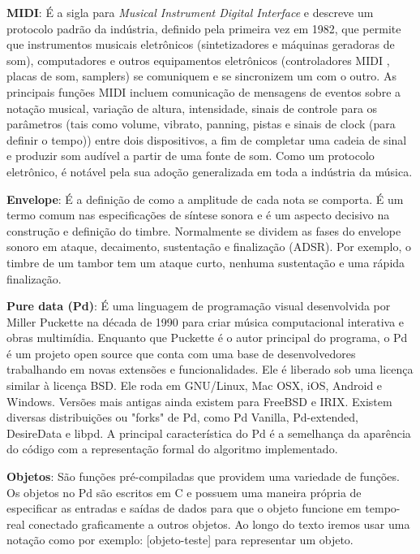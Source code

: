 \documentclass[draft]{ppgmus}
\begin{document}

\textbf{MIDI}: É a sigla para \textit{Musical Instrument Digital Interface} e descreve um protocolo padrão da indústria, 
definido pela primeira vez em 1982, que permite que instrumentos musicais eletrônicos 
(sintetizadores e máquinas geradoras de som), computadores e outros equipamentos eletrônicos (controladores MIDI , 
placas de som, samplers) se comuniquem e se sincronizem um com o outro. 
As principais funções MIDI incluem comunicação de mensagens de eventos sobre a notação musical,  variação de altura, 
intensidade, sinais de controle para os parâmetros (tais como volume, vibrato, panning, pistas e sinais de 
clock (para definir o tempo)) entre dois dispositivos, a fim de completar uma cadeia de sinal e produzir som 
audível a partir de uma fonte de som. Como um protocolo eletrônico, é notável pela sua adoção generalizada em 
toda a indústria da música.


\textbf{Envelope}: É a definição de como a amplitude de cada nota se comporta.
É um termo comum nas especificações de síntese sonora e é um aspecto decisivo na construção e 
definição do timbre. Normalmente se dividem as fases do
envelope sonoro em ataque, decaimento, sustentação e finalização (ADSR). Por
exemplo, o timbre de um tambor tem um ataque curto, nenhuma sustentação
e uma rápida finalização.

\textbf{Pure data (Pd)}: É uma linguagem de programação visual desenvolvida por Miller Puckette na década de 1990 
para criar música computacional interativa e obras multimídia. Enquanto que Puckette é o autor principal do programa, 
o Pd é um projeto open source que conta com uma base de desenvolvedores trabalhando em novas extensões e funcionalidades.
Ele é liberado sob uma licença similar à licença BSD. Ele roda em GNU/Linux, Mac OSX, iOS, Android e Windows. 
Versões mais antigas ainda existem para FreeBSD e IRIX. Existem diversas distribuições ou "forks" de Pd, como 
Pd Vanilla, Pd-extended, DesireData e libpd. A principal característica do Pd é a semelhança da aparência do código com
a representação formal do algoritmo implementado.


\textbf{Objetos}: São funções pré-compiladas que providem uma variedade de funções.
Os objetos no Pd são escritos em C e possuem uma maneira própria de especificar as entradas e saídas
de dados para que o objeto funcione em tempo-real conectado graficamente a outros objetos.
Ao longo do texto iremos usar uma notação como por exemplo: [objeto-teste] para
representar um objeto.
\end{document}
